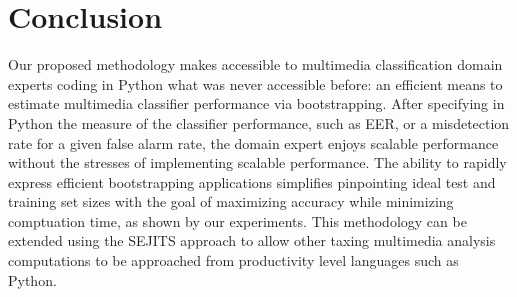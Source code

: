 \section{Conclusion}

Our proposed methodology makes accessible to multimedia classification domain experts coding in Python what was never accessible before: an efficient means to estimate multimedia classifier performance via bootstrapping. 
After specifying in Python the measure of the classifier performance, such as EER, or a misdetection rate for a given false alarm rate, the domain expert enjoys scalable performance without the stresses of implementing scalable performance. 
The ability to rapidly express efficient bootstrapping applications simplifies pinpointing ideal test and training set sizes with the goal of maximizing accuracy while minimizing comptuation time, as shown by our experiments. 
This methodology can be extended using the SEJITS approach to allow other taxing multimedia analysis computations to be approached from productivity level languages such as Python. 


